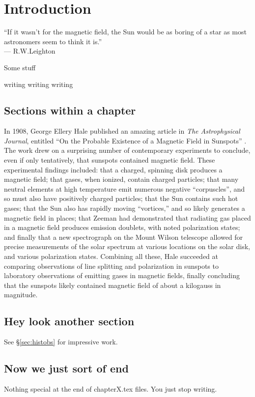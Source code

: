 \chapter{Introduction}\label{chap:intro}
\noindent ``If it wasn't for the magnetic field, the Sun would be as boring of a star as most astronomers seem to think it is.''\\
\hspace*{\fill} --- R.W.Leighton

Some stuff

writing writing writing

\section{\label{sec:histobs}Sections within a chapter}

In 1908, George Ellery Hale published an amazing article in \textsl{The Astrophysical Journal}, entitled ``On the Probable Existence of a Magnetic Field in Sunspots'' .  The work drew on a surprising number of contemporary experiments to conclude, even if only tentatively, that sunspots contained magnetic field.  These experimental findings included: that a charged, spinning disk produces a magnetic field; that gases, when ionized, contain charged particles; that many neutral elements at high temperature emit numerous negative ``corpuscles'', and so must also have positively charged particles; that the Sun contains such hot gases; that the Sun  also has rapidly moving ``vortices,'' and so likely generates a magnetic field in places; that Zeeman had demonstrated that radiating gas placed in a magnetic field produces emission doublets, with noted polarization states; and finally that a new spectrograph on the Mount Wilson telescope allowed for precise measurements of the solar spectrum at various locations on the solar disk, and various polarization states.  Combining all these, Hale succeeded at comparing observations of line splitting and polarization in sunspots to laboratory observations of emitting gases in magnetic fields, finally concluding that the sunspots likely contained magnetic field of about a kilogauss in magnitude.


\section{\label{sec:emerge}Hey look another section}
See \S\ref{sec:histobs} for impressive work.

\section{\label{sec:ch1end}Now we just sort of end}
Nothing special at the end of chapterX.tex files.  You just stop writing.
